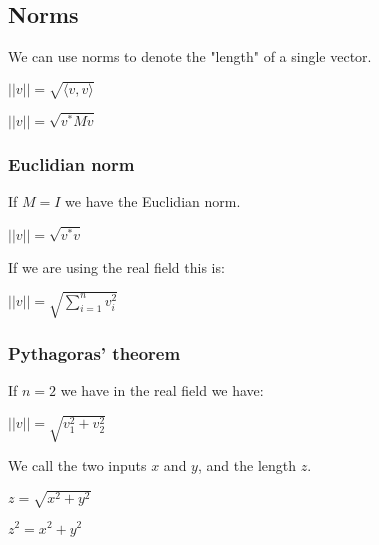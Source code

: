 
\subsection{Norms}

We can use norms to denote the "length" of a single vector.

\(||v||=\sqrt {\langle v, v\rangle }\)

\(||v||=\sqrt {v^*Mv}\)

\subsubsection{Euclidian norm}

If \(M=I\) we have the Euclidian norm.

\(||v||=\sqrt{v^*v}\)

If we are using the real field this is:

\(||v||=\sqrt{\sum_{i=1}^{n}v^2_i}\)

\subsubsection{Pythagoras' theorem}

If \(n=2\) we have in the real field we have:

\(||v||=\sqrt{v_1^2+v_2^2}\)

We call the two inputs \(x\) and \(y\), and the length \(z\).

\(z=\sqrt {x^2+y^2}\)

\(z^2=x^2+y^2\)

